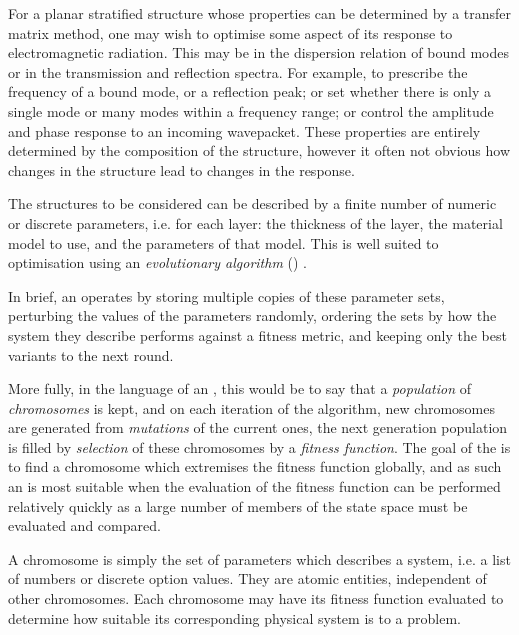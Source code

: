 For a planar stratified structure whose properties can be determined by a
transfer matrix method, one may wish to optimise some aspect of its response to
electromagnetic radiation.
This may be in the dispersion relation of bound modes or in the transmission and
reflection spectra.
For example, to prescribe the frequency of a bound mode, or a
reflection peak; or set whether there is only a single mode or
many modes within a frequency range; or control the amplitude and phase response
to an incoming wavepacket.
These properties are entirely determined by the composition of the structure,
however it often not obvious how changes in the structure lead to changes in the
response.

The structures to be considered can be described by a finite number of numeric
or discrete parameters, i.e. for each layer: the thickness of the layer, the
material model to use, and the parameters of that model.
This is well suited to optimisation using an \emph{evolutionary algorithm}
(\ea) \cite{Spears2000}.

In brief, an \ea operates by storing multiple copies of these parameter sets,
perturbing the values of the parameters randomly, ordering the sets by how the
system they describe performs against a fitness metric, and keeping only the
best variants to the next round.

More fully, in the language of an \ea, this would be to say that a
\emph{population} of \emph{chromosomes} is kept, and on each iteration of the
algorithm, new chromosomes are generated from \emph{mutations} of the current
ones, the next generation population is filled by \emph{selection} of these
chromosomes by a \emph{fitness function}.
The goal of the \ea is to find a chromosome which extremises the fitness
function globally, and as such an \ea is most suitable when the evaluation of
the fitness function can be performed relatively quickly as a large number of
members of the state space must be evaluated and compared.

A chromosome is simply the set of parameters which describes a system, i.e.
a list of numbers or discrete option values.
They are atomic entities, independent of other chromosomes.
Each chromosome may have its fitness function evaluated to determine how
suitable its corresponding physical system is to a problem.

